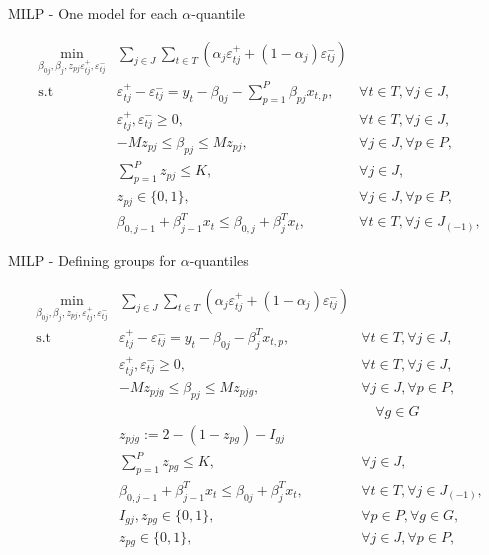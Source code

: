 \begin{frame}{MILP - One model for each \(\alpha\)-quantile}

\[
\begin{array}{lll}
 \underset{\beta_{0j},\beta_j,z_{p j} \varepsilon_{t j}^{+},\varepsilon_{t j}^{-}}{\text{min}} & \sum_{j \in J} \sum_{t\in T}\left(\alpha_j\varepsilon_{t j}^{+}+(1-\alpha_j)\varepsilon_{t j}^{-}\right)  & \\
\mbox{s.t } & \varepsilon_{t j}^{+}-\varepsilon_{t j}^{-}=y_{t}-\beta_{0 j}-\sum_{p=1}^{P}\beta_{p j}x_{t,p},& \forall t \in T ,\forall j \in J, \\
& \varepsilon_{t j}^{+},\varepsilon_{t j}^{-}\geq0,&\forall t \in T ,\forall j \in J, \\
& - M z_{p j} \leq \beta_{p j} \leq M z_{p j},& \forall j \in J, \forall p\in P, \\
& \sum_{p=1}^P z_{p j} \leq K, &  \forall j \in J, \\
& z_{p j} \in \{0,1\},& \forall j \in J, \forall p\in P,\\
& \beta_{0,j-1} + \beta_{j-1}^T x_{t} \leq \beta_{0,j} + \beta_{j}^T x_{t}, & \forall t \in T, \forall j \in J_{(-1)},
\end{array}
\]

\end{frame}

\begin{frame}{MILP - Defining groups for \(\alpha\)-quantiles}

\[
\begin{array}{lll}
 \underset{\beta_{0j},\beta_j,z_{p j}, \varepsilon_{t j}^{+},\varepsilon_{t j}^{-}}{\text{min}} & \sum_{j \in J} \sum_{t\in T}\left(\alpha_j\varepsilon_{t j}^{+}+(1-\alpha_j)\varepsilon_{t j}^{-}\right)  & \\
\mbox{s.t } & \varepsilon_{t j}^{+}-\varepsilon_{t j}^{-}=y_{t}-\beta_{0 j}-\beta_{j}^T x_{t,p},& \forall t \in T ,\forall j \in J, \\
& \varepsilon_{t j}^{+},\varepsilon_{t j}^{-}\geq0,&\forall t \in T ,\forall j \in J, \\
& - M z_{p j g} \leq \beta_{p j} \leq M z_{p j g},& \forall j \in J, \forall p\in P,  \\
& & \quad \forall g \in G \\
&z_{p j g} := 2 - ( 1-z_{pg}) - I_{gj}& \\
& \sum_{p=1}^P z_{p g} \leq K, &  \forall j \in J, \\
& \beta_{0,j-1} + \beta_{j-1}^T x_{t} \leq \beta_{0j} + \beta_{j}^T x_{t}, & \forall t \in T, \forall j \in J_{(-1)},\\
& I_{gj}, z_{pg} \in \{0,1\},& \forall p \in P,\forall g \in G, \\
& z_{p g} \in \{0,1\},& \forall j \in J, \forall p\in P,\\
\end{array}
\]

\end{frame}

